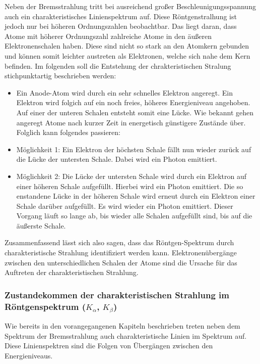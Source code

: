 \documentclass{article}
\begin{document}
Neben der Bremsstrahlung tritt bei ausreichend großer Beschleunigungsspannung auch ein charakteristisches Linienspektrum auf. Diese Röntgenstralhung ist jedoch nur bei höheren Ordnungszahlen beobachtbar. Das liegt daran, dass Atome mit höherer Ordnungszahl zahlreiche Atome in den äußeren Elektronenschalen haben. Diese sind nicht so stark an den Atomkern gebunden und können somit leichter austreten als Elektronen, welche sich nahe dem Kern befinden. Im folgenden soll die Entstehung der chrakteristischen Stralung stichpunktartig beschrieben werden:
\begin{itemize}
    \item Ein Anode-Atom wird durch ein sehr schnelles Elektron angeregt. Ein Elektron wird folgich auf ein noch freies, höheres Energieniveau angehoben. Auf einer der unteren Schalen entsteht somit eine Lücke. Wie bekannt gehen angeregt Atome nach kurzer Zeit in energetisch günstigere Zustände über. Folglich kann folgendes passieren:
    \item Möglichkeit 1: Ein Elektron der höchsten Schale fällt nun wieder zurück auf die Lücke der untersten Schale. Dabei wird ein Photon emittiert.
    \item Möglichkeit 2: Die Lücke der untersten Schale wird durch ein Elektron auf einer höheren Schale aufgefüllt. Hierbei wird ein Photon emittiert. Die so enstandene Lücke in der höheren Schale wird erneut durch ein Elektron einer Schale darüber aufgefüllt. Es wird wieder ein Photon emittiert. Dieser Vorgang läuft so lange ab, bis wieder alle Schalen aufgefüllt sind, bis auf die äußerste Schale.
\end{itemize}

Zusammenfassend lässt sich also sagen, dass das Röntgen-Spektrum durch charakteristische Strahlung identifiziert werden kann. Elektronenübergänge zwischen den unterschiedlichen Schalen der Atome sind die Ursache für das Auftreten der charakteristischen Strahlung.

\subsubsection{Zustandekommen der charakteristischen Strahlung im Röntgenspektrum ($K_\alpha$, $K_\beta$)}

\cite{leifiphysik_C}

Wie bereits in den vorangegangenen Kapiteln beschrieben treten neben dem Spektrum der Bremsstrahlung auch charakteristische Linien im Spektrum auf. Diese Linienspektren sind die Folgen von Übergängen zwischen den Energieniveaus. 
\end{document}
